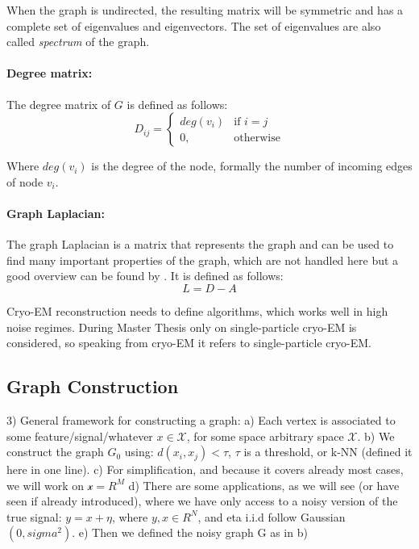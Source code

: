 When the graph is undirected, the resulting matrix will be symmetric and has a complete set of eigenvalues
and eigenvectors. The set of eigenvalues are also called \textit{spectrum} of the graph.

\paragraph{Degree matrix:}
The degree matrix of $G$ is defined as follows:
\begin{equation}
    D_{ij} =    
    \begin{cases}
        deg(v_i)  & \text{if } i = j \\
        0, & \text{otherwise}
    \end{cases}
\end{equation}

Where $deg(v_i)$ is the degree of the node, formally the number of incoming edges of node $v_i$.

\paragraph{Graph Laplacian:}
The graph Laplacian is a matrix that represents the graph and can be used to find many important properties of the graph, 
which are not handled here but a good overview can be found by \cite{tutorialSpectralClustering, SpectralGraphTheory}. 
It is defined as follows:
\begin{equation}
    L = D - A
\end{equation}



\begin{tcolorbox}[colback=red!5!white,colframe=red!75!black]
    Cryo-EM reconstruction needs to define algorithms, which works well in high noise regimes.
    During Master Thesis only on single-particle cryo-EM is considered, so speaking from cryo-EM 
    it refers to single-particle cryo-EM.
\end{tcolorbox}



\subsection{Graph Construction}
3) General framework for constructing a graph:
a) Each vertex is associated to some feature/signal/whatever $x\in \mathcal{X}$, for some space arbitrary space $\mathcal{X}$.
b) We construct the graph $G_0$ using: $d(x_i,x_j) < \tau$, $\tau$ is a threshold, or k-NN (defined it here in one line).
c) For simplification, and because it covers already most cases, we will work on $\mathcal{x}= R^M$
d) There are some applications, as we will see (or have seen if already introduced), where we have only access to a noisy version of the true signal:
 $y = x + \eta$, where $y,x \in R^N$, and eta i.i.d follow Gaussian $(0,sigma^2)$.
e) Then we defined the noisy graph G as in b)

